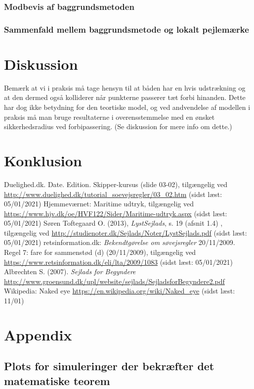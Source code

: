 \documentclass[%
 reprint,
nofootinbib,
aps,
]{revtex4-1}
\begin{document}
\subsubsection{Modbevis af baggrundsmetoden}
\subsubsection{Sammenfald mellem baggrundsmetode og lokalt pejlemærke}

\section{Diskussion}

Bemærk at vi i praksis må tage hensyn til at båden har en hvis udstrækning og at den dermed også kolliderer når punkterne passerer tæt forbi hinanden. Dette har dog ikke betydning for den teortiske model, og ved andvendelse af modellen i praksis må man bruge resultaterne i overensstemmelse med en ønsket sikkerhedsradius ved forbipassering. (Se diskussion for mere info om dette.)


\section{Konklusion}

\begin{thebibliography}{}
   Duelighed.dk. Date. Edition. Skipper-kursus (slide 03-02), tilgængelig ved \url{http://www.duelighed.dk/tutorial_soevejsregler/03_02.htm} (sidst læst: 05/01/2021)
   Hjemmeværnet: Maritime udtryk, tilgængelig ved \url{https://www.hjv.dk/oe/HVF122/Sider/Maritime-udtryk.aspx} (sidst læst: 05/01/2021)
   Søren Toftegaard O. (2013), \textit{LystSejlads}, s. 19 (afsnit 1.4) , tilgængelig ved \url{http://studienoter.dk/Sejlads/Noter/LystSejlads.pdf} (sidst læst: 05/01/2021)
   retsinformation.dk: \textit{Bekendtgørelse om søvejsregler} 20/11/2009. Regel 7: fare for sammenstød (d) (20/11/2009), tilgængelig ved \url{https://www.retsinformation.dk/eli/lta/2009/1083} (sidst læst: 05/01/2021)
   Albrechten S. (2007). \textit{Sejlads for Begyndere} \url{http://www.groensund.dk/upl/website/sejlads/SejladsforBegyndere2.pdf}
   Wikipedia: Naked eye \url{https://en.wikipedia.org/wiki/Naked_eye} (sidst læst: 11/01)
\end{thebibliography}

\section*{Appendix}
\subsection{Plots for simuleringer der bekræfter det matematiske teorem}


%
\end{document}
